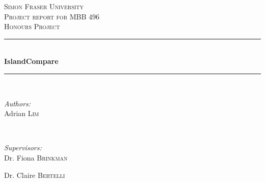 	\begin{titlepage}

		\newcommand{\HRule}{\rule{\linewidth}{0.5mm}} %

		\center %


		\textsc{\LARGE Simon Fraser University}\\[1.5cm] %
		\textsc{\Large Project report for MBB 496}\\[0.5cm] %
		\textsc{\large Honours Project}\\[0.5cm] %


		\HRule \\[0.4cm]
		{ \huge \bfseries IslandCompare}\\[0.4cm] %
		\HRule \\[1.5cm]


		\begin{minipage}{0.4\textwidth}
			\begin{flushleft} \large
				\emph{Authors:}\\
				Adrian \textsc{Lim} \\
			\end{flushleft}
		\end{minipage}
		~
		\begin{minipage}{0.4\textwidth}
			\begin{flushright} \large
				\emph{Supervisors:} \\
				Dr. Fiona \textsc{Brinkman} %

				Dr. Claire \textsc{Bertelli} %
			\end{flushright}
		\end{minipage}\\[2cm]


\end{titlepage}
